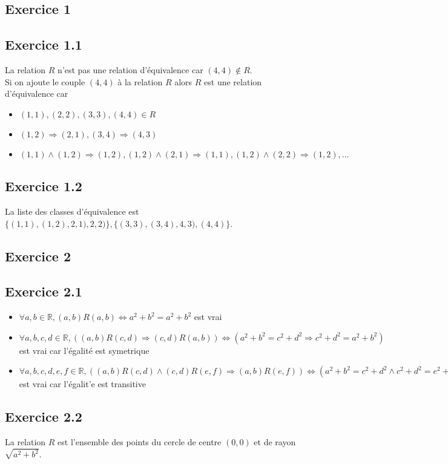 \documentclass[]{book}
\theoremstyle{definition}
\newcommand{\bb}[1]{\mathbb{#1}}
\newcommand{\R}{\bb{R}}
\begin{document}
\newpage
\subsection*{Exercice 1}
\subsection*{Exercice 1.1}
La relation $R$ n'est pas une relation d'\'equivalence car $(4,4) \not\in R$.\\
Si on ajoute le couple $(4,4)$ \`a la relation $R$ alors $R$ est une relation d'\'equivalence car 
\begin{itemize}
\item $(1,1),(2,2),(3,3),(4,4) \in R$
\item $(1,2) \Rightarrow (2,1), (3,4) \Rightarrow (4,3)$
\item $(1,1) \wedge (1,2) \Rightarrow (1,2), (1,2) \wedge (2,1) \Rightarrow (1,1), (1,2) \wedge (2,2) \Rightarrow (1,2),\ldots $
\end{itemize}

\subsection*{Exercice 1.2}
La liste des classes d'\'equivalence est $\{(1,1),(1,2),2,1),2,2)\}, \{(3,3),(3,4),4,3),(4,4)\}$.


\subsection*{Exercice 2}
\subsection*{Exercice 2.1}
\begin{itemize}
\item $\forall a,b \in \R, (a,b)R(a,b) \Leftrightarrow a^2+b^2 = a^2 + b^2$ est vrai
\item $\forall a,b,c,d \in \R, ((a,b)R(c,d) \Rightarrow (c,d)R(a,b)) \Leftrightarrow (a^2+b^2 = c^2 + d^2 \Rightarrow c^2 + d^2 = a^2+b^2)$ est vrai car l'\'egalit\'e est symetrique
\item $\forall a,b,c,d,e,f \in \R, ((a,b)R(c,d) \wedge (c,d)R(e,f) \Rightarrow (a,b)R(e,f)) \Leftrightarrow (a^2+b^2 = c^2 + d^2 \wedge c^2 + d^2 = e^2+f^2\Rightarrow a^2 + b^2 = e^2+f^2)$ est vrai car l'\'egalit'e est transitive
\end{itemize}

\subsection*{Exercice 2.2}
La relation $R$ est l'ensemble des points du cercle de centre $(0,0)$ et de rayon $\sqrt{a^2+b^2}$.
\end{document}
